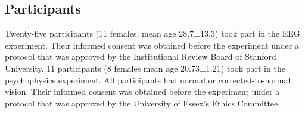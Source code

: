 \documentclass[9pt,twocolumn,twoside,lineno]{pnas-new}
\begin{document}







\subsection*{Participants}
Twenty-five participants (11 females, mean age 28.7±13.3) took part in the EEG experiment. Their informed consent was obtained before the experiment under a protocol that was approved by the Institutional Review Board of Stanford University. 11 participants (8 females mean age 20.73±1.21) took part in the psychophysics experiment. All participants had normal or corrected-to-normal vision. Their informed consent was obtained before the experiment under a protocol that was approved by the University of Essex's Ethics Committee.
\end{document}

